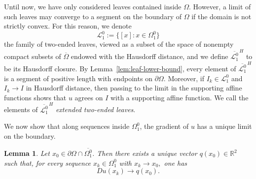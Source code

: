 \documentclass[reqno,11pt]{amsart}
\makeatletter
\newtheorem{lem}[thm]{Lemma}%
\numberwithin{equation}{section}
\theoremstyle{remark}
\makeatother
\begin{document}
Until now, we have only considered leaves contained inside $\Omega$. However, a limit of such leaves may converge to a segment on the boundary of $\Omega$ if the domain is not strictly convex. For this reason, we denote
\[
\mathscr L_1^0:=\{[x]:x\in \Omega_1^0\}
\]
the family of two-ended leaves, viewed as a subset of the space of nonempty
compact subsets of \(\overline\Omega\) endowed with the Hausdorff distance, and we define \(\overline{\mathscr L_1^0}^{\,H}\) to be
its Hausdorff closure. By Lemma~\ref{lem:leaf-lower-bound}, every element of
\(\overline{\mathscr L_1^0}^{\,H}\) is a segment of positive length with
endpoints on \(\partial\Omega\). Moreover, if \(I_k\in \mathscr L_1^0\) and
\(I_k\to I\) in Hausdorff distance, then passing to the limit in the supporting
affine functions shows that \(u\) agrees on \(I\) with a supporting affine
function. We call the elements of \(\overline{\mathscr L_1^0}^{\,H}\)
\emph{extended two-ended leaves}.

We now show that along sequences inside $\Omega_1^0$, the gradient of $u$ has a unique limit on the boundary.

\begin{lem}\label{lem:leaf-slope-limit}
Let $x_0\in \partial\Omega\cap \overline{\Omega_1^0}$.
Then there exists a unique vector
$q(x_0)\in \mathbb R^2$
such that, for every sequence
$x_k\in \Omega_1^0$ with
$x_k\to x_0,$
one has
\[
Du(x_k)\to q(x_0).
\]
\end{lem}
\end{document}
